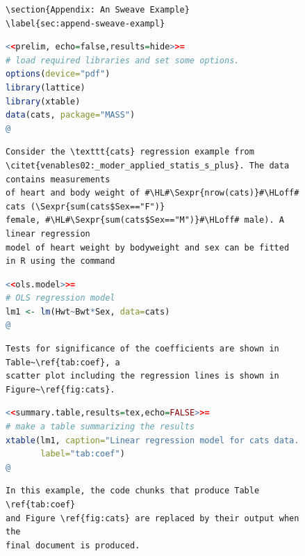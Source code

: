 \documentclass[11pt,article]{memoir}
\begin{document}
\begin{figure}
\begin{lstlisting}[style=sweave-top]

\end{lstlisting} 
\begin{lstlisting}[language={[latex]tex},numbers=none,style=sweave-tex]   
\section{Appendix: An Sweave Example}
\label{sec:append-sweave-exampl}
\end{lstlisting}
\begin{lstlisting}[language=R,numbers=none,style=sweave-r] 
<<prelim, echo=false,results=hide>>=
# load required libraries and set some options.
options(device="pdf")
library(lattice)
library(xtable)
data(cats, package="MASS")
@ 
\end{lstlisting}
\begin{lstlisting}[language={[latex]tex},numbers=none,style=sweave-tex] 
Consider the \texttt{cats} regression example from 
\citet{venables02:_moder_applied_statis_s_plus}. The data contains measurements 
of heart and body weight of #\HL#\Sexpr{nrow(cats)}#\HLoff# cats (\Sexpr{sum(cats$Sex=="F")}
female, #\HL#\Sexpr{sum(cats$Sex=="M")}#\HLoff# male). A linear regression
model of heart weight by bodyweight and sex can be fitted in R using the command
\end{lstlisting} 
\begin{lstlisting}[language=R,numbers=none,style=sweave-r] 
<<ols.model>>=
# OLS regression model 
lm1 <- lm(Hwt~Bwt*Sex, data=cats)
@ 
\end{lstlisting}
\begin{lstlisting}[language={[latex]tex},numbers=none,style=sweave-tex] 
Tests for significance of the coefficients are shown in Table~\ref{tab:coef}, a 
scatter plot including the regression lines is shown in Figure~\ref{fig:cats}.
\end{lstlisting}

\begin{lstlisting}[language=R,numbers=none,style=sweave-r] 
<<summary.table,results=tex,echo=FALSE>>=
# make a table summarizing the results
xtable(lm1, caption="Linear regression model for cats data.", 
       label="tab:coef")
@ 
\end{lstlisting}
\begin{lstlisting}[language={[latex]tex},numbers=none,style=sweave-tex] 
In this example, the code chunks that produce Table \ref{tab:coef} 
and Figure \ref{fig:cats} are replaced by their output when the 
final document is produced. 


\end{lstlisting}
\end{figure}
\end{document}
